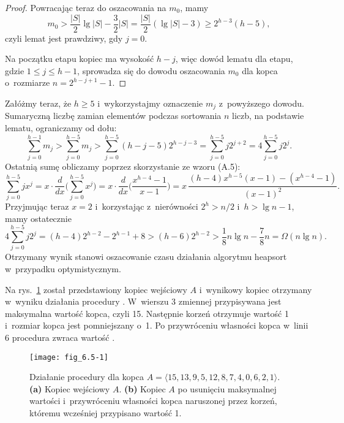 \begin{proof}
Powracając teraz do oszacowania na $m_0$, mamy
\[
    m_0 > \frac{|S|}{2}\lg|S|-\frac{3}{2}|S| = \frac{|S|}{2}(\lg|S|-3) \ge 2^{h-3}(h-5),
\]
czyli lemat jest prawdziwy, gdy $j=0$.

Na początku  etapu kopiec ma wysokość $h-j$, więc dowód lematu dla  etapu, gdzie $1\le j\le h-1$, sprowadza się do dowodu oszacowania $m_0$ dla kopca o~rozmiarze $n=2^{h-j+1}-1$.
\end{proof}

Załóżmy teraz, że $h\ge5$ i~wykorzystajmy oznaczenie $m_j$ z~powyższego dowodu.
Sumaryczną liczbę zamian elementów podczas sortowania $n$ liczb, na podstawie lematu, ograniczamy od dołu:
\[
    \sum_{j=0}^{h-1}m_j > \sum_{j=0}^{h-5}m_j > \sum_{j=0}^{h-5}(h-j-5)2^{h-j-3} = \sum_{j=0}^{h-5}j2^{j+2} = 4\sum_{j=0}^{h-5}j2^j.
\]
Ostatnią sumę obliczamy poprzez skorzystanie ze wzoru (A.5):
\[
    \sum_{j=0}^{h-5}jx^j = x\cdot\frac{d}{dx}\biggl(\sum_{j=0}^{h-5}x^j\biggr) = x\cdot\frac{d}{dx}\biggl(\frac{x^{h-4}-1}{x-1}\biggr) = x\,\frac{(h-4)x^{h-5}(x-1)-(x^{h-4}-1)}{(x-1)^2}.
\]
Przyjmując teraz $x=2$ i~korzystając z~nierówności $2^h>n/2$ i~$h>\lg n-1$, mamy ostatecznie
\[
    4\sum_{j=0}^{h-5}j2^j = (h-4)2^{h-2}-2^{h-1}+8 > (h-6)2^{h-2} > \frac{1}{8}n\lg n-\frac{7}{8}n = \Omega(n\lg n).
\]
Otrzymany wynik stanowi oszacowanie czasu działania algorytmu heapsort w~przypadku optymistycznym.


\exercise %
Na rys.\ \ref{fig:6.5-1} został przedstawiony kopiec wejściowy $A$ i~wynikowy kopiec otrzymany w~wyniku działania procedury .
W~wierszu 3 zmiennej  przypisywana jest maksymalna wartość kopca, czyli 15.
Następnie korzeń otrzymuje wartość 1 i~rozmiar kopca jest pomniejszany o~1.
Po przywróceniu własności kopca w~linii 6 procedura zwraca wartość .
\begin{figure}[ht]
	\begin{center}
		\texttt{[image: fig\_6.5-1]}
	\end{center}
	\caption{Działanie procedury  dla kopca $A=\langle15,13,9,5,12,8,7,4,0,6,2,1\rangle$.
{\sffamily\bfseries(a)} Kopiec wejściowy $A$.
{\sffamily\bfseries(b)} Kopiec $A$ po usunięciu maksymalnej wartości i~przywróceniu własności kopca naruszonej przez korzeń, któremu wcześniej przypisano wartość 1.} \label{fig:6.5-1}
\end{figure}

